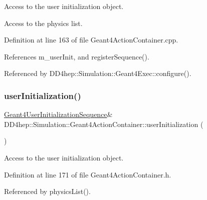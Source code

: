 Access to the user initialization object. 

Access to the physics list. 

Definition at line 163 of file Geant4\+Action\+Container.\+cpp.



References m\+\_\+user\+Init, and register\+Sequence().



Referenced by D\+D4hep\+::\+Simulation\+::\+Geant4\+Exec\+::configure().

\hypertarget{class_d_d4hep_1_1_simulation_1_1_geant4_action_container_a22b7e6487bab568fec3798fe1e1593f0}{}\label{class_d_d4hep_1_1_simulation_1_1_geant4_action_container_a22b7e6487bab568fec3798fe1e1593f0} 
\subsubsection{\texorpdfstring{user\+Initialization()}{userInitialization()}\hspace{0.1cm}{\footnotesize\ttfamily [2/2]}}
{\footnotesize\ttfamily \hyperlink{class_d_d4hep_1_1_simulation_1_1_geant4_user_initialization_sequence}{Geant4\+User\+Initialization\+Sequence}\& D\+D4hep\+::\+Simulation\+::\+Geant4\+Action\+Container\+::user\+Initialization (\begin{DoxyParamCaption}{ }\end{DoxyParamCaption})\hspace{0.3cm}{\ttfamily [inline]}}



Access to the user initialization object. 



Definition at line 171 of file Geant4\+Action\+Container.\+h.



Referenced by physics\+List().

\hypertarget{class_d_d4hep_1_1_simulation_1_1_geant4_action_container_a6fe45521592147fe47d7cc545add8ca0}{}\label{class_d_d4hep_1_1_simulation_1_1_geant4_action_container_a6fe45521592147fe47d7cc545add8ca0} 
